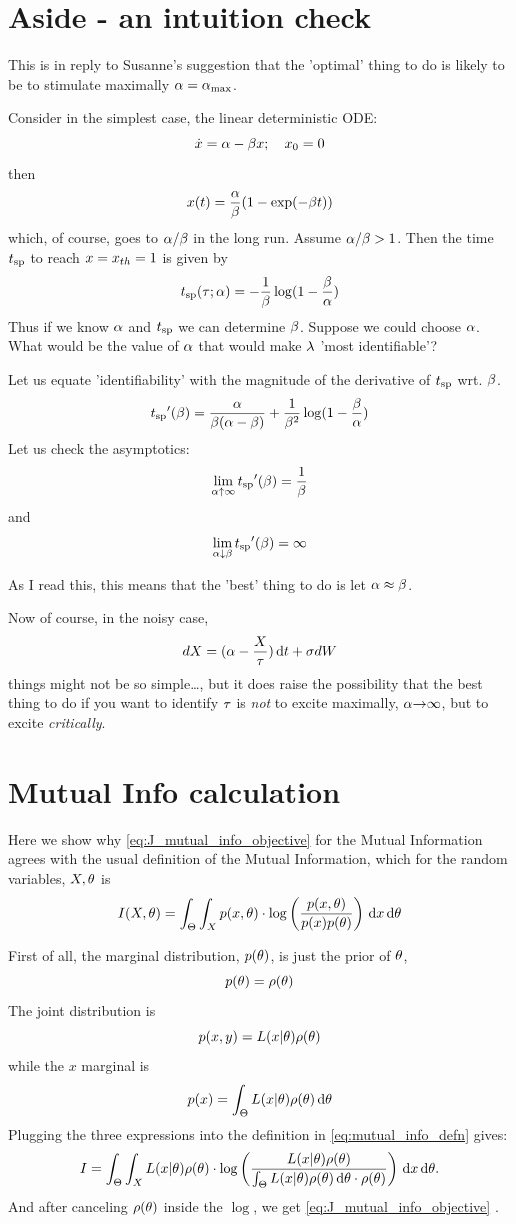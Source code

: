 \documentclass{article}
\begin{document}
\section{Aside - an intuition check}
\label{sec:alpha_crit_is_best_hypothesis}
This is in reply to Susanne's suggestion that the 'optimal' thing to do is
likely to be to stimulate maximally ${\alpha} = { {\alpha}_{\textrm{max}} }$. 

Consider in the simplest case, the linear deterministic ODE:
$$
\dot{x} = {\alpha} - {\beta}  x; \quad x_0 = 0
$$
then
$$
x(t) =  \frac{{\alpha}}{{\beta}} (1 - \exp(- {\beta} t))
$$
which, of course, goes to ${\alpha}/ {\beta}$ in the long run. 
Assume ${\alpha}/{\beta} > 1$. Then the time ${ t_{\textrm{sp} } }$ to reach $x = { x_{th} } = 1$
is given by
$$
{ t_{\textrm{sp} } } ({\tau}; {\alpha}) = -\frac 1{{\beta}}  \log( 1- \frac{{\beta}}{{\alpha} })
$$
Thus if we know
${\alpha}$ and ${ t_{\textrm{sp} } }$ we can determine ${\beta}$. Suppose we could choose ${\alpha}$. What would
be the value of ${\alpha}$ that would make ${\lambda}$ 'most identifiable'?

Let us equate 'identifiability' with the magnitude of the derivative of ${ t_{\textrm{sp} } }$
wrt. ${\beta}$.
$$
{ t_{\textrm{sp} } }'({\beta}) = \frac{{\alpha}}{{\beta} ( {\alpha} - {\beta})}  + \frac{1}{{\beta}^2}\log(1-\frac{{\beta}}{{\alpha} })   
$$
Let us check the asymptotics:
$$
\lim_{{\alpha} \uparrow \infty} { t_{\textrm{sp} } }'({\beta}) = \frac 1{{\beta}}
$$
and 
$$
\lim_{{\alpha} \downarrow {\beta}} { t_{\textrm{sp} } }'({\beta}) =  \infty
$$
 
As I read this, this means that the 'best' thing to do is let ${\alpha} \approx {\beta}$.

Now of course, in the noisy case, 
$$
dX = ({\alpha} - \frac{X}{{\tau}}) \, \mathrm{d} t + {\sigma } dW 
$$
things might not be so simple\ldots, but it does raise the possibility that the
best thing to do if you want to identify ${\tau}$ is {\itshape not} to excite
maximally, ${\alpha} {\rightarrow} \infty$, but to excite {\itshape critically}.

\section{Mutual Info calculation}
\label{sec:mutual_info_defn} 

Here we show why \cref{eq:J_mutual_info_objective} for the Mutual Information
agrees with the usual definition of the Mutual Information, which for the random variables, $X,{\theta}$ is
\begin{equation}
I(X,{\theta}) = \int_\Theta \int_X p(x,{\theta}) \cdot \log \left(
\frac{p(x,{\theta})}{p(x)p({\theta})}\right) \, \mathrm{d} x \, \mathrm{d} {\theta}
\label{eq:mutual_info_defn}
\end{equation}
 
First of all, the marginal distribution, $p({\theta})$,  is just the prior of ${\theta}$,
$$p({\theta}) = \rho({\theta})$$ The joint distribution is $$p(x,y) = L(x|{\theta})\rho({\theta})$$ while the $x$
marginal is $$p(x) = \int_\Theta L(x|{\theta})\rho({\theta}) \, \mathrm{d} {\theta}$$
Plugging the three expressions into the definition in
\cref{eq:mutual_info_defn} gives:
\begin{equation}
I = \int_\Theta \int_X L(x|{\theta})\rho({\theta}) \cdot 
\log \left( \frac{L(x|{\theta})\rho({\theta}) }{\int_\Theta L(x|{\theta})\rho({\theta}) \, \mathrm{d} {\theta}
\cdot \rho({\theta}) } \right)
\, \mathrm{d} x\, \mathrm{d} {\theta}.
\label{eq:mutual_info_prior_trajectory}
\end{equation}
And after canceling $\rho({\theta})$ inside the $\log$, we get
\cref{eq:J_mutual_info_objective} .
\end{document}
